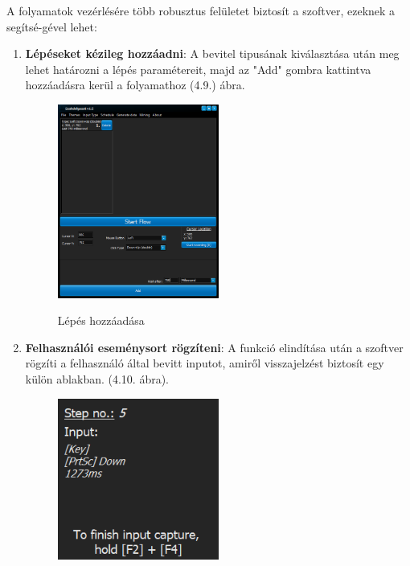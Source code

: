 
A folyamatok vezérlésére több robusztus felületet biztosít a szoftver, ezeknek a segítsé\hyp{}gével lehet:
\begin{enumerate}
	\item{
		\textbf{Lépéseket kézileg hozzáadni}: A bevitel tipusának kiválasztása után meg lehet határozni a lépés paramétereit, majd az "Add" gombra kattintva hozzáadásra kerül a folyamathoz (4.9.) ábra.
		\begin{figure}[h!]
			\begin{center}
				\includegraphics[width=0.5\textwidth, keepaspectratio=true]{images/img_flow_add}\\
				\caption{Lépés hozzáadása}
				\label{fig:example}
			\end{center}
		\end{figure}
	}
	\item{
		\textbf{Felhasználói eseménysort rögzíteni}: A funkció elindítása után a szoftver rögzíti a felhasználó által bevitt inputot, amiről visszajelzést biztosít egy külön ablakban. (4.10. ábra).
		\begin{figure}[h!]
			\begin{center}
				\includegraphics[width=0.5\textwidth, keepaspectratio=true]{images/img_flow_capture}\\

\end{center}
\end{figure}}
\end{enumerate}
